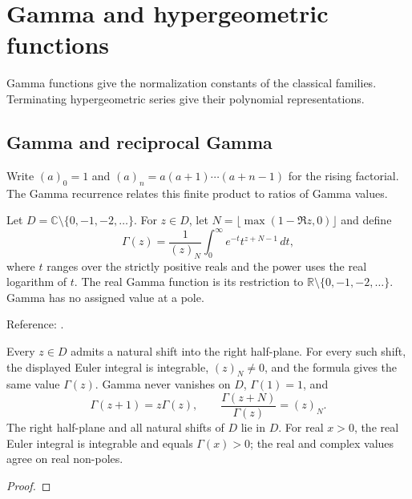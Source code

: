 \chapter{Gamma and hypergeometric functions}\label{chap:special-functions}


Gamma functions give the normalization constants of the classical families. Terminating hypergeometric series give their polynomial representations.

\section{Gamma and reciprocal Gamma}\label{sec:textbook-special-functions-gamma}

Write $(a)_0=1$ and $(a)_n=a(a+1)\cdots(a+n-1)$ for the rising factorial. The Gamma recurrence relates this finite product to ratios of Gamma values.

\begin{definition}
\label{def:gamma-function}
\leanok
Let $D=\mathbb C\setminus\{0,-1,-2,\ldots\}$. For $z\in D$, let
$N=\lfloor\max(1-\Re z,0)\rfloor$ and define
\[
 \Gamma(z)=\frac{1}{(z)_N}\int_0^\infty e^{-t}t^{z+N-1}\,dt,
\]
where $t$ ranges over the strictly positive reals and the power uses the real
logarithm of $t$. The real Gamma function is its restriction to
$\mathbb R\setminus\{0,-1,-2,\ldots\}$. Gamma has no assigned value at a pole.

Reference: \cite[5.2.1, 5.5.1]{dlmf}.
\end{definition}

\begin{theorem}
\label{thm:gamma-function}
\leanok
Every $z\in D$ admits a natural shift into the right half-plane. For every
such shift, the displayed Euler integral is integrable, $(z)_N\ne0$, and
the formula gives the same value $\Gamma(z)$. Gamma never vanishes on $D$,
$\Gamma(1)=1$, and
\[
 \Gamma(z+1)=z\Gamma(z),\qquad
 \frac{\Gamma(z+N)}{\Gamma(z)}=(z)_N.
\]
The right half-plane and all natural shifts of $D$ lie in $D$.
For real $x>0$, the real Euler integral is integrable and equals
$\Gamma(x)>0$; the real and complex values agree on real non-poles.
\end{theorem}
\begin{proof}
\leanok
\end{proof}

